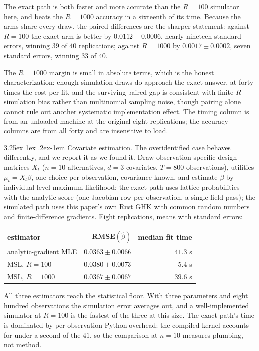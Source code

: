 \documentclass[11pt]{article}
\makeatletter
\renewcommand\paragraph{\@startsection{paragraph}{4}{\z@}%
  {3.25ex \@plus1ex \@minus.2ex}{-1em}%
  {\normalfont\normalsize\itshape}}
\makeatother
\begin{document}
\noindent The exact path is both faster and more accurate than the
$R=100$ simulator here, and beats the $R=1000$ accuracy in a sixteenth
of its time. Because the arms share every draw, the paired differences
are the sharper statement: against $R=100$ the exact arm is better by
$0.0112\pm0.0006$, nearly nineteen standard errors, winning $39$ of $40$
replications; against $R=1000$ by $0.0017\pm0.0002$, seven standard
errors, winning $33$ of $40$.

The $R=1000$ margin is small in absolute terms, which is the honest
characterization: enough simulation draws do approach the exact answer,
at forty times the cost per fit, and the surviving paired gap is
consistent with finite-$R$ simulation bias rather than multinomial
sampling noise, though pairing alone cannot rule out another systematic
implementation effect. The timing column is from
an unloaded machine at the original eight replications; the accuracy
columns are from all forty and are insensitive to load.

\paragraph{Covariate estimation.} The overidentified case behaves
differently, and we report it as we found it. Draw observation-specific
design matrices $X_t$ ($n=10$ alternatives, $d=3$ covariates,
$T=800$ observations), utilities $\mu_t=X_t\beta$, one choice per
observation, covariance known, and estimate $\beta$ by individual-level
maximum likelihood: the exact path uses lattice probabilities with the
analytic score (one Jacobian row per observation, a single field pass);
the simulated path uses this paper's own Rust GHK with common random
numbers and finite-difference gradients. Eight replications, means with
standard errors:

\begin{center}\small
\begin{tabular}{lrr}
\toprule
estimator & RMSE$(\hat\beta)$ & median fit time \\
\midrule
analytic-gradient MLE & $0.0363\pm0.0066$ & $41.3$ s \\
MSL, $R=100$ & $0.0380\pm0.0073$ & $5.4$ s \\
MSL, $R=1000$ & $0.0367\pm0.0067$ & $39.6$ s \\
\bottomrule
\end{tabular}
\end{center}

\noindent All three estimators reach the statistical floor. With three
parameters and eight hundred observations the simulation error averages
out, and a well-implemented simulator at $R=100$ is the fastest of the
three at this size. The exact path's time is dominated by per-observation
Python overhead: the compiled kernel accounts for under a second of the
$41$, so the comparison at $n=10$ measures plumbing, not method.
\end{document}
